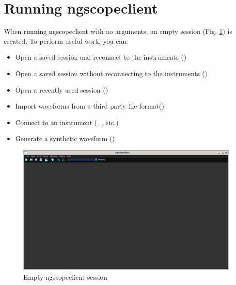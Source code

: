 \section{Running ngscopeclient}

When running ngscopeclient with no arguments, an empty session (Fig. \ref{empty-window}) is created. To perform useful
work, you can:
\begin{itemize}
\item Open a saved session and reconnect to the instruments ()
\item Open a saved session without reconnecting to the instruments ()
\item Open a recently used session ()
\item Import waveforms from a third party file format()
\item Connect to an instrument (, , etc.)
\item Generate a synthetic waveform ()
\end{itemize}

\begin{figure}[h]
\centering
	\includegraphics[width=12cm]{ng-images/empty-window.png}
\caption{Empty ngscopeclient session}
\label{empty-window}
\end{figure}

